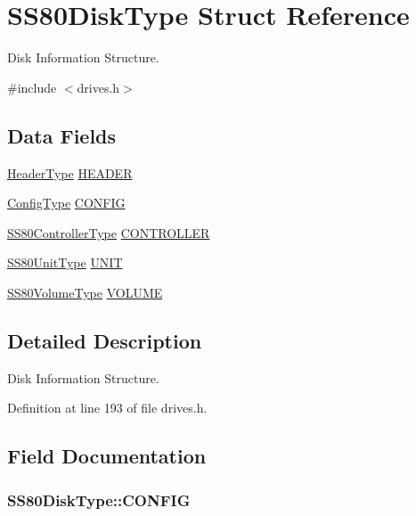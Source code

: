 \hypertarget{structSS80DiskType}{}\section{S\+S80\+Disk\+Type Struct Reference}
\label{structSS80DiskType}


Disk Information Structure.  




{\ttfamily \#include $<$drives.\+h$>$}

\subsection*{Data Fields}
\begin{DoxyCompactItemize}
\item 
\hyperlink{structHeaderType}{Header\+Type} \hyperlink{structSS80DiskType_ae66c0130dee8c362743dfdfc41539c3b}{H\+E\+A\+D\+ER}
\item 
\hyperlink{structConfigType}{Config\+Type} \hyperlink{structSS80DiskType_aeff2b9e1dcd95310e9e8dee63a60ed95}{C\+O\+N\+F\+IG}
\item 
\hyperlink{structSS80ControllerType}{S\+S80\+Controller\+Type} \hyperlink{structSS80DiskType_ae9da84cba5786cf755c388eba065c0cd}{C\+O\+N\+T\+R\+O\+L\+L\+ER}
\item 
\hyperlink{structSS80UnitType}{S\+S80\+Unit\+Type} \hyperlink{structSS80DiskType_ac630da1440afd60d726c7c41eb7b990c}{U\+N\+IT}
\item 
\hyperlink{structSS80VolumeType}{S\+S80\+Volume\+Type} \hyperlink{structSS80DiskType_adef69576dbc48a5d70ff628578d77b60}{V\+O\+L\+U\+ME}
\end{DoxyCompactItemize}


\subsection{Detailed Description}
Disk Information Structure. 

Definition at line 193 of file drives.\+h.



\subsection{Field Documentation}
\subsubsection[{\texorpdfstring{C\+O\+N\+F\+IG}{CONFIG}}]{ S\+S80\+Disk\+Type\+::\+C\+O\+N\+F\+IG}\hypertarget{structSS80DiskType_aeff2b9e1dcd95310e9e8dee63a60ed95}{}\label{structSS80DiskType_aeff2b9e1dcd95310e9e8dee63a60ed95}


